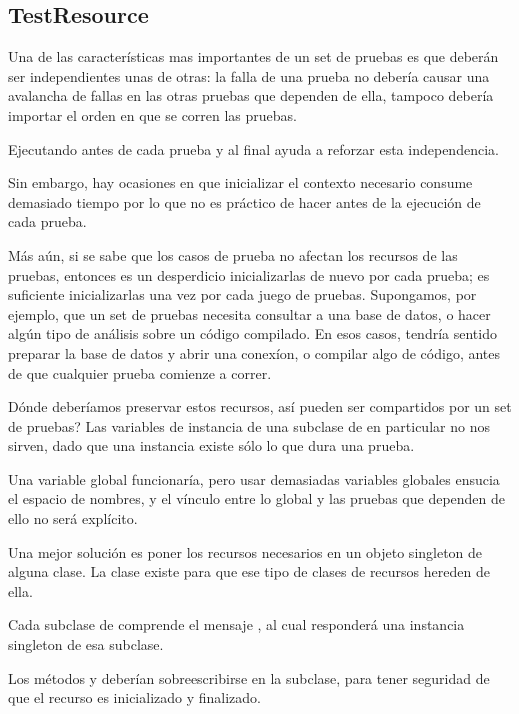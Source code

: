 \documentclass[a4paper,10pt,twoside]{book}
\begin{document}
\subsection{TestResource}

Una de las caracter\'isticas mas importantes de un set de pruebas es que 
deber\'an ser independientes unas de otras: la falla de una prueba no deber\'ia causar una avalancha
de fallas en las otras pruebas que dependen de ella, tampoco deber\'ia importar el orden en que se corren las
pruebas.  

Ejecutando  antes de cada prueba y  al final ayuda a reforzar esta independencia.
 
Sin embargo, hay ocasiones en que inicializar el contexto necesario consume demasiado tiempo por lo que no es 
pr\'actico de hacer antes de la ejecuci\'on de cada prueba.

M\'as a\'un, si se sabe que los casos de prueba no afectan los recursos de las pruebas, entonces es un
desperdicio inicializarlas de nuevo por cada prueba; es suficiente inicializarlas una vez por cada juego
de pruebas.
Supongamos, por ejemplo, que un set de pruebas necesita consultar a una base de datos, o hacer
alg\'un tipo de an\'alisis sobre un c\'odigo compilado.
En esos casos, tendr\'ia sentido preparar la base de datos y abrir una conex\'ion, o compilar algo
de c\'odigo, antes de que cualquier prueba comienze a correr.


\¿D\'onde deber\'iamos preservar estos recursos, as\'i pueden ser compartidos por un set de pruebas?
Las variables de instancia de una subclase de  en particular no nos sirven, dado que una instancia
existe s\'olo lo que dura una prueba.

Una variable global funcionar\'ia, pero usar demasiadas variables globales ensucia el espacio de nombres,
y el v\'inculo entre lo global y las pruebas que dependen de ello no ser\'a expl\'icito. 

Una mejor soluci\'on es poner los recursos necesarios en un objeto singleton de alguna clase.
La clase  existe para que ese tipo de clases de recursos hereden de ella.

Cada subclase de   comprende el mensaje , al cual responder\'a una instancia singleton de esa subclase.

Los m\'etodos  y  deber\'ian sobreescribirse en la subclase, para tener seguridad de que el
recurso es inicializado y finalizado. 
\end{document}
